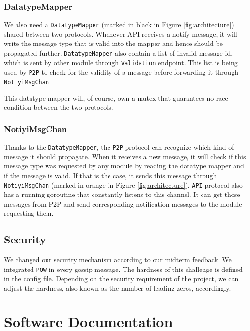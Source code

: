 \subsubsection{DatatypeMapper}

We also need a \texttt{DatatypeMapper} (marked in black in Figure \ref{fig:architecture}) shared between two protocols. Whenever API receives a notify message, it will write the message type that is valid into the mapper and hence should be propagated further. \texttt{DatatypeMapper} also contain a list of invalid message id, which is sent by other module through \texttt{Validation} endpoint. This list is being used by \texttt{P2P} to check for the validity of a message before forwarding it through \texttt{NotiyiMsgChan} 

This datatype mapper will, of course, own a mutex that guarantees no race condition between the two protocols.

\subsubsection{NotiyiMsgChan}

Thanks to the \texttt{DatatypeMapper}, the \texttt{P2P} protocol can recognize which kind of message it should propagate. When it receives a new message, it will check if this message type was requested by any module by reading the datatype mapper and if the message is valid. If that is the case, it sends this message through \texttt{NotiyiMsgChan} (marked in orange in Figure \ref{fig:architecture}). \texttt{API} protocol also has a running goroutine that constantly listens to this channel. It can get those messages from P2P and send corresponding notification messages to the module requesting them. 

\subsection{Security}

We changed our security mechanism according to our midterm feedback. We integrated \texttt{POW} in every gossip message. The hardness of this challenge is defined in the config file. Depending on the security requirement of the project, we can adjust the hardness, also known as the number of leading zeros, accordingly. 

\section{Software Documentation}


